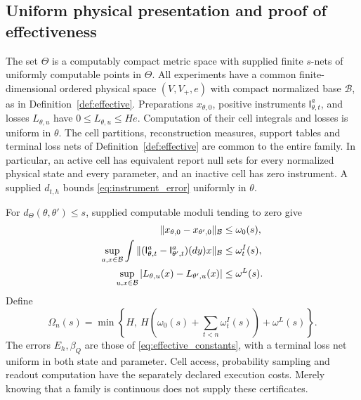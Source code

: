 \subsection{Uniform physical presentation and proof of effectiveness}
\begin{definition}\label{def:uniform_effective}
The set $\Theta$ is a computably compact metric space with supplied finite $s$-nets of uniformly computable points in $\Theta$. All experiments have a common finite-dimensional ordered physical space $(V,V_+,e)$ with compact normalized base $\mathcal B$, as in Definition~\ref{def:effective}. Preparations $x_{\theta,0}$, positive instruments $\mathsf I_{\theta,t}^a$, and losses $L_{\theta,u}$ have $0\le L_{\theta,u}\le He$. Computation of their cell integrals and losses is uniform in $\theta$. The cell partitions, reconstruction measures, support tables and terminal loss nets of Definition~\ref{def:effective} are common to the entire family. In particular, an active cell has equivalent report null sets for every normalized physical state and every parameter, and an inactive cell has zero instrument. A supplied $d_{t,h}$ bounds \eqref{eq:instrument_error} uniformly in $\theta$.

For $d_\Theta(\theta,\theta')\le s$, supplied computable moduli tending to zero give
\begin{align}\label{eq:parameter_moduli}
 \|x_{\theta,0}-x_{\theta',0}\|_{\mathcal B}&\le\omega_0(s),\\
 \sup_{a,x\in\mathcal B}\int
  \| (\mathsf I_{\theta,t}^a-\mathsf I_{\theta',t}^a)(dy)x\|_{\mathcal B}
       &\le\omega_t^{I}(s),\notag\\
 \sup_{u,x\in\mathcal B}|L_{\theta,u}(x)-L_{\theta',u}(x)|
       &\le\omega^L(s).\notag
\end{align}
Define
\begin{equation}\label{eq:parameter_Omega}
 \Omega_n(s)=\min\left\{H,\ H\left(\omega_0(s)+\sum_{t<n}\omega_t^I(s)\right)
                                  +\omega^L(s)\right\}.
\end{equation}
The errors $E_h,\beta_Q$ are those of \eqref{eq:effective_constants}, with a terminal loss net uniform in both state and parameter. Cell access, probability sampling and readout computation have the separately declared execution costs. Merely knowing that a family is continuous does not supply these certificates.
\end{definition}

